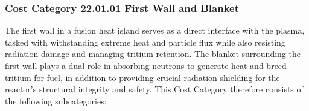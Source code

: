 
\subsubsection*{Cost Category 22.01.01 First Wall and Blanket}

The first wall in a fusion heat island serves as a direct interface with the plasma, tasked with withstanding extreme heat and particle flux while also resisting radiation damage and managing tritium retention. The blanket surrounding the first wall plays a dual role in absorbing neutrons to generate heat and breed tritium for fuel, in addition to providing crucial radiation shielding for the reactor's structural integrity and safety.  This Cost Category therefore consists of the following subcategories:


